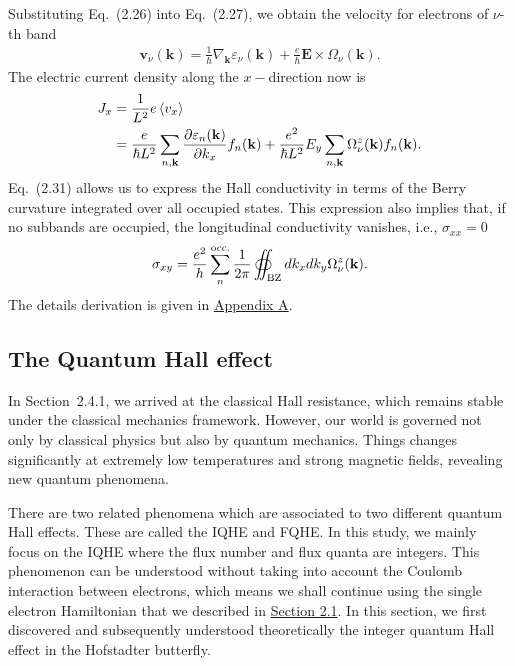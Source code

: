 Substituting Eq.~(2.26) into Eq.~(2.27), we obtain the velocity for electrons of $\nu$-th band
\begin{gather}
	\mathbf{v}_{\nu}(\mathbf{k}) = \frac{1}{\hbar} \nabla_{\mathbf{k}} \varepsilon_{\nu} (\mathbf{k}) + \frac{e}{\hbar} \mathbf{E} \times \Omega_{\nu} (\mathbf{k}).
\end{gather}
The electric current density along the $x-$direction now is
\begin{equation}
	\begin{aligned}
		J_{x} &= \frac{1}{L^{2}} e \ev{v_{x}} \\
		&= \frac{e}{\hbar L^{2}} \sum_{n,\mathbf{k}} \frac{\partial \varepsilon_{n}(\mathbf{k})}{\partial k_{x}} f_{n}(\mathbf{k}) + \frac{e^{2}}{\hbar L^{2}} E_{y} \sum_{n,\mathbf{k}} \Omega_{\nu}^{z}(\mathbf{k}) f_{n}(\mathbf{k}).
	\end{aligned}
\end{equation}
Eq.~(2.31) allows us to express the Hall conductivity in terms of the Berry curvature integrated over all occupied states. This expression also implies that, if no subbands are occupied, the longitudinal conductivity vanishes, i.e., $\sigma_{xx} = 0$
\begin{gather}
	\sigma_{xy} = \dfrac{e^{2}}{h} \sum_{n}^{\text{occ.}} \dfrac{1}{2\pi} \displaystyle\oiint_{\text{{BZ}}} d k_{x} d k_{y} \Omega_{\nu}^{z} (\mathbf{k}).
\end{gather}
The details derivation is given in \hyperref[appendix A]{Appendix A}.


\subsection{The Quantum Hall effect}
In Section~2.4.1, we arrived at the classical Hall resistance, which remains stable under the classical mechanics framework. However, our world is governed not only by classical physics but also by quantum mechanics. Things changes significantly at extremely low temperatures and strong magnetic fields, revealing new quantum phenomena.

There are two related phenomena which are associated to two different quantum Hall effects. These are called the \ac{IQHE} and \ac{FQHE}. In this study, we mainly focus on the \ac{IQHE} where the flux number and flux quanta are integers. This phenomenon can be understood without taking into account the Coulomb interaction between electrons, which means we shall continue using the single electron Hamiltonian that we described in \hyperref[Section 2.1]{Section 2.1}. In this section, we first discovered and subsequently understood theoretically the integer quantum Hall effect in the Hofstadter butterfly.

